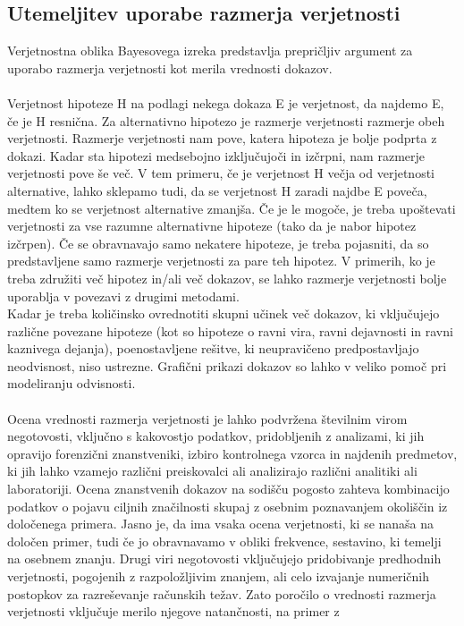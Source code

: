 \documentclass[12pt,a4paper]{amsart}
\theoremstyle{definition} %
\theoremstyle{plain} %
\begin{document}
\subsection{Utemeljitev uporabe razmerja verjetnosti}
Verjetnostna oblika Bayesovega izreka predstavlja prepričljiv argument za uporabo razmerja verjetnosti kot merila vrednosti dokazov.\\\\
Verjetnost hipoteze H na podlagi nekega dokaza E je verjetnost, da najdemo E, če je H resnična. Za alternativno hipotezo je razmerje verjetnosti razmerje obeh
verjetnosti. Razmerje verjetnosti nam pove, katera hipoteza je bolje podprta z dokazi. Kadar sta hipotezi medsebojno izključujoči in izčrpni, nam razmerje verjetnosti pove še več.
V tem primeru, če je verjetnost H večja od verjetnosti alternative, lahko sklepamo tudi, da se verjetnost H zaradi najdbe E poveča, medtem ko se
verjetnost alternative zmanjša. Če je le mogoče, je treba upoštevati verjetnosti za vse razumne alternativne hipoteze (tako da je nabor hipotez
izčrpen). Če se obravnavajo samo nekatere hipoteze, je treba pojasniti, da so predstavljene samo razmerje verjetnosti za pare teh hipotez. V primerih, ko je treba
združiti več hipotez in/ali več dokazov, se lahko razmerje verjetnosti bolje uporablja v povezavi z drugimi metodami.\\
Kadar je treba količinsko ovrednotiti skupni učinek več dokazov, ki vključujejo različne povezane hipoteze (kot so hipoteze o ravni vira, ravni
dejavnosti in ravni kaznivega dejanja), poenostavljene rešitve, ki neupravičeno predpostavljajo neodvisnost, niso ustrezne. Grafični prikazi dokazov
so lahko v veliko pomoč pri modeliranju odvisnosti.\\\\
Ocena vrednosti razmerja verjetnosti je lahko podvržena številnim virom negotovosti, vključno s kakovostjo podatkov, pridobljenih z analizami, ki jih
opravijo forenzični znanstveniki, izbiro kontrolnega vzorca in najdenih predmetov, ki jih lahko vzamejo različni preiskovalci ali analizirajo različni
analitiki ali laboratoriji. Ocena znanstvenih dokazov na sodišču pogosto zahteva kombinacijo podatkov o pojavu ciljnih značilnosti skupaj z osebnim poznavanjem
okoliščin iz določenega primera. Jasno je, da ima vsaka ocena verjetnosti, ki se nanaša na določen primer, tudi če jo obravnavamo v obliki frekvence, sestavino,
ki temelji na osebnem znanju. Drugi viri negotovosti vključujejo pridobivanje predhodnih verjetnosti, pogojenih z razpoložljivim znanjem, ali celo
izvajanje numeričnih postopkov za razreševanje računskih težav. Zato poročilo o vrednosti razmerja verjetnosti vključuje merilo njegove natančnosti, na primer z
\end{document}
